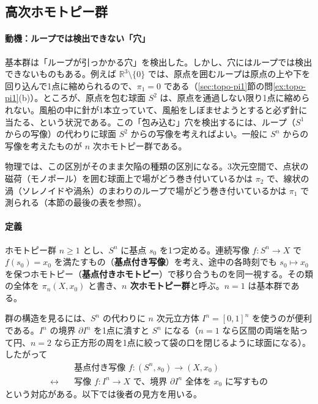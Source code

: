 \documentclass[uplatex, dvipdfmx, book]{jsbook}
\let\origsubsection\subsection
\let\origsubsubsection\subsubsection
\renewcommand{\section}{\origsubsection}
\renewcommand{\subsection}{\origsubsubsection}
\renewcommand{\subsubsection}{\paragraph}
\begin{document}
\section{高次ホモトピー群}
\label{sec:topo-pin}

\paragraph{動機：ループでは検出できない「穴」}
基本群は「ループが引っかかる穴」を検出した。しかし、穴にはループでは検出できないものもある。例えば $\mathbb{R}^3 \setminus \{0\}$ では、原点を囲むループは原点の上や下を回り込んで1点に縮められるので、$\pi_1 = 0$ である（\ref{sec:topo-pi1}節の問\ref{ex:topo-pi1}(b)）。ところが、原点を包む球面 $S^2$ は、原点を通過しない限り1点に縮められない。風船の中に針が1本立っていて、風船をしぼませようとすると必ず針に当たる、という状況である。この「包み込む」穴を検出するには、ループ（$S^1$ からの写像）の代わりに球面 $S^2$ からの写像を考えればよい。一般に $S^n$ からの写像を考えたものが $n$ 次ホモトピー群である。

物理では、この区別がそのまま欠陥の種類の区別になる。3次元空間で、点状の磁荷（モノポール）を囲む球面上で場がどう巻き付いているかは $\pi_2$ で、線状の渦（ソレノイドや渦糸）のまわりのループで場がどう巻き付いているかは $\pi_1$ で測られる（本節の最後の表を参照）。

\paragraph{定義}
\quad
\begin{mydef}{ホモトピー群}{}
$n \ge 1$ とし、$S^n$ に基点 $s_0$ を1つ定める。連続写像 $f: S^n \to X$ で $f(s_0) = x_0$ を満たすもの（\textbf{基点付き写像}）を考え、途中の各時刻でも $s_0 \mapsto x_0$ を保つホモトピー（\textbf{基点付きホモトピー}）で移り合うものを同一視する。その類の全体を $\pi_n(X, x_0)$ と書き、\textbf{$n$ 次ホモトピー群}と呼ぶ。$n = 1$ は基本群である。
\end{mydef}

群の構造を見るには、$S^n$ の代わりに $n$ 次元立方体 $I^n = [0, 1]^n$ を使うのが便利である。$I^n$ の境界 $\partial I^n$ を1点に潰すと $S^n$ になる（$n = 1$ なら区間の両端を貼って円、$n = 2$ なら正方形の周を1点に絞って袋の口を閉じるように球面になる）。したがって
\begin{equation*}
    \begin{aligned}
        &\text{基点付き写像 } f: (S^n, s_0) \to (X, x_0) \\
        \longleftrightarrow\quad &\text{写像 } f: I^n \to X \text{ で、境界 } \partial I^n \text{ 全体を } x_0 \text{ に写すもの}
    \end{aligned}
\end{equation*}
という対応がある。以下では後者の見方を用いる。
\end{document}
